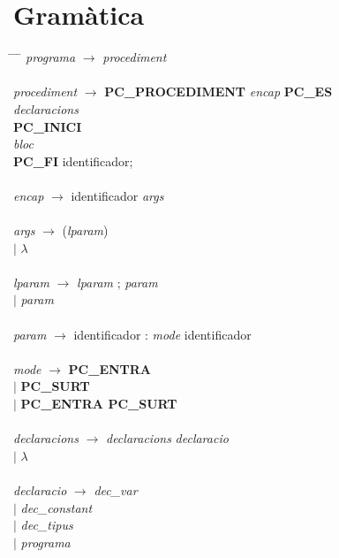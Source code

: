 \documentclass[10pt]{report}
\begin{document}
    \section{Gramàtica}
    \begin{tabbing}
    \hspace*{2.0cm} \= \hspace*{0.5cm} \= \hspace*{0.8cm} \= \kill
        \textit{programa} \> $\rightarrow $ \> \textit{procediment} \\
        \\
        \textit{procediment} \> $ \rightarrow $ \> \textbf{PC\_PROCEDIMENT} \textit{encap} \textbf{PC\_ES} \\
        \> \> \> \textit{declaracions} \\
        \> \> \textbf{PC\_INICI} \\
        \> \> \> \textit{bloc} \\
        \> \> \textbf{PC\_FI} identificador; \\
        \\
        \textit{encap} \> $ \rightarrow $ \> identificador \textit{args} \\
        \\
        \textit{args} \> $\rightarrow$ \> (\textit{lparam}) \\
        \> $ \mid $ \> $ \lambda $ \\
        \\
        \textit{lparam} \> $\rightarrow$ \> \textit{lparam} ; \textit{param} \\
        \> $\mid$ \> \textit{param} \\
        \\
        \textit{param} \> $\rightarrow$ \> identificador : \textit{mode} identificador \\
        \\
        \textit{mode} \> $\rightarrow$ \> \textbf{PC\_ENTRA} \\
        \> $\mid$ \> \textbf{PC\_SURT} \\
        \> $\mid$ \> \textbf{PC\_ENTRA PC\_SURT} \\
        \\
        \textit{declaracions} \> $\rightarrow$ \> \textit{declaracions} \textit{declaracio} \\
        \> $\mid$ \> $\lambda$ \\
        \\
        \textit{declaracio} \> $\rightarrow$ \> \textit{dec\_var} \\
        \> $\mid$ \> \textit{dec\_constant} \\
        \> $\mid$ \> \textit{dec\_tipus} \\
        \> $\mid$ \> \textit{programa} \\
        \\
        

\end{tabbing}
\end{document}
